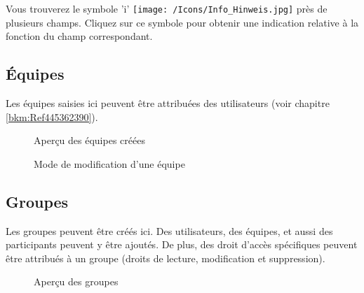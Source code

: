 Vous trouverez le symbole 'i' \texttt{[image: /Icons/Info\_Hinweis.jpg]} près de plusieurs champs. Cliquez sur ce symbole pour obtenir une indication relative à la fonction du champ correspondant.

\subsection{Équipes}

Les équipes saisies ici peuvent être attribuées des utilisateurs (voir chapitre \ref{bkm:Ref445362390}).

\begin{figure}[H]
\caption{Aperçu des équipes créées}
\end{figure}

\begin{figure}[H]
\caption{Mode de modification d'une équipe}
\end{figure}

\clearpage
\subsection{Groupes}

Les groupes peuvent être créés ici. Des utilisateurs, des équipes, et aussi des participants peuvent y être ajoutés. De plus, des droit d'accès spécifiques peuvent être attribués à un groupe (droits de lecture, modification et suppression).

\begin{figure}[H]
\caption{Aperçu des groupes}
\end{figure}

